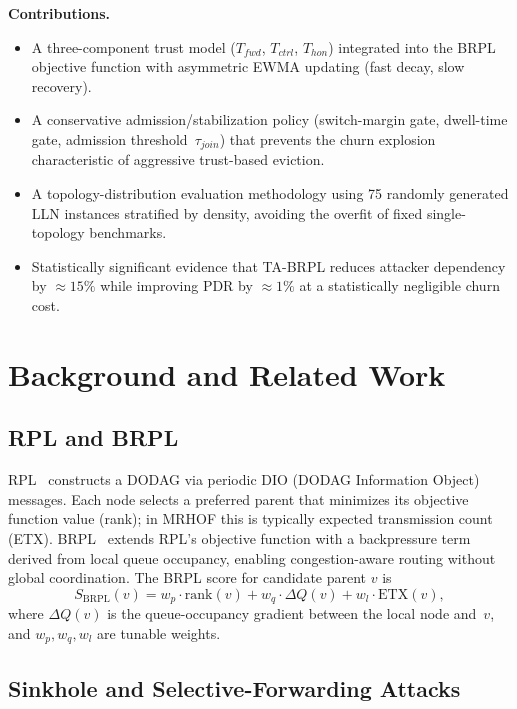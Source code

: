 \documentclass[conference]{IEEEtran}
\begin{document}
\smallskip\noindent\textbf{Contributions.}
\begin{itemize}
\item A three-component trust model ($T_{fwd}$, $T_{ctrl}$, $T_{hon}$)
  integrated into the BRPL objective function
  with asymmetric EWMA updating (fast decay, slow recovery).
\item A conservative admission/stabilization policy
  (switch-margin gate, dwell-time gate, admission threshold~$\tau_{join}$)
  that prevents the churn explosion characteristic of
  aggressive trust-based eviction.
\item A topology-distribution evaluation methodology using
  75 randomly generated LLN instances stratified by density,
  avoiding the overfit of fixed single-topology benchmarks.
\item Statistically significant evidence that TA-BRPL reduces
  attacker dependency by $\approx 15\%$ while improving PDR by $\approx 1\%$
  at a statistically negligible churn cost.
\end{itemize}

\section{Background and Related Work}
\label{sec:background}

\subsection{RPL and BRPL}

RPL~\cite{rfc6550} constructs a DODAG via periodic DIO (DODAG Information Object)
messages.
Each node selects a preferred parent that minimizes its objective function value
(rank); in MRHOF this is typically expected transmission count (ETX).
BRPL~\cite{brpl} extends RPL's objective function with a backpressure term
derived from local queue occupancy, enabling congestion-aware routing
without global coordination.
The BRPL score for candidate parent $v$ is
\begin{equation}
  S_{\text{BRPL}}(v) = w_p \cdot \text{rank}(v)
                     + w_q \cdot \Delta Q(v)
                     + w_l \cdot \text{ETX}(v),
  \label{eq:brpl_score}
\end{equation}
where $\Delta Q(v)$ is the queue-occupancy gradient between the local node
and~$v$, and $w_p, w_q, w_l$ are tunable weights.

\subsection{Sinkhole and Selective-Forwarding Attacks}
\end{document}
